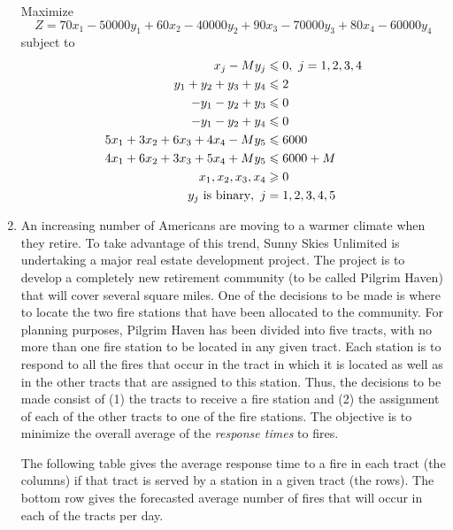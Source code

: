 \documentclass[a4paper]{article}
\begin{document}
\begin{enumerate}
\begin{solution}
	Maximize $$Z=70x_1-50000y_1+60x_2-40000y_2+90x_3-70000y_3+80x_4-60000y_4$$
	subject to
	\begin{equation*}
	\begin{aligned}
	x_j-My_j&\leqslant 0,\ j=1,2,3,4\\
	y_1+y_2+y_3+y_4&\leqslant 2\\
	-y_1-y_2+y_3&\leqslant 0\\
	-y_1-y_2+y_4&\leqslant 0\\
	5x_1+3x_2+6x_3+4x_4-My_5&\leqslant 6000\\
	4x_1+6x_2+3x_3+5x_4+My_5&\leqslant 6000+M\\
	x_1,x_2,x_3,x_4&\geqslant 0\\
	y_j \text{ is binary},\ j&=1,2,3,4,5
	\end{aligned}
	\end{equation*}
\end{solution}

\item An increasing number of Americans are moving to a warmer climate when they retire. To take advantage of this trend, Sunny Skies Unlimited is undertaking a major real estate development project. The project is to develop a completely new retirement community (to be called Pilgrim Haven) that will cover several square miles. One of the decisions to be made is where to locate the two fire stations that have been allocated to the community. For planning purposes, Pilgrim Haven has been divided into five tracts, with no more than one fire station to be located in any given tract. Each station is to respond to all the fires that occur in the tract in which it is located as well as in the other tracts that are assigned to this station. Thus, the decisions to be made consist of (1) the tracts to receive a fire station and (2) the assignment of each of the other tracts to one of the fire stations. The objective is to minimize the overall average of the \textit{response times} to fires.

\hspace*{4ex}The following table gives the average response time to a fire in each tract (the columns) if that tract is served by a station in a given tract (the rows). The bottom row gives the forecasted average number of fires that will occur in each of the tracts per day.


\end{enumerate}
\end{document}
